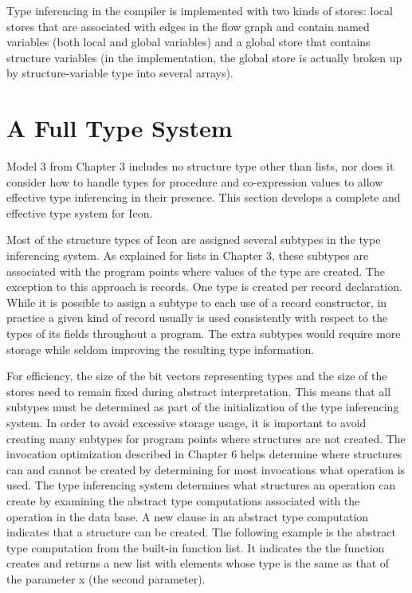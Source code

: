 Type inferencing in the compiler is implemented with two kinds of
stores: local stores that are associated with edges in the flow graph
and contain named variables (both local and global variables) and a
global store that contains structure variables (in the implementation,
the global store is actually broken up by structure-variable type into
several arrays).


\section{A Full Type System}

Model 3 from Chapter 3 includes no structure type other than lists,
nor does it consider how to handle types for procedure and
co-expression values to allow effective type inferencing in their
presence. This section develops a complete and effective type system
for Icon.

Most of the structure types of Icon are assigned several subtypes in
the type inferencing system. As explained for lists in Chapter 3,
these subtypes are associated with the program points where values of
the type are created. The exception to this approach is records. One
type is created per record declaration. While it is possible to assign
a subtype to each use of a record constructor, in practice a given
kind of record usually is used consistently with respect to the types
of its fields throughout a program. The extra subtypes would require
more storage while seldom improving the resulting type information.

For efficiency, the size of the bit vectors representing types and the
size of the stores need to remain fixed during abstract
interpretation. This means that all subtypes must be determined as
part of the initialization of the type inferencing system. In order to
avoid excessive storage usage, it is important to avoid creating many
subtypes for program points where structures are not created. The
invocation optimization described in Chapter 6 helps determine where
structures can and cannot be created by determining for most
invocations what operation is used. The type inferencing system
determines what structures an operation can create by examining the
abstract type computations associated with the operation in the data
base. A new clause in an abstract type computation indicates that a
structure can be created. The following example is the abstract type
computation from the built-in function list. It indicates the the
function creates and returns a new list with elements whose type is
the same as that of the parameter x (the second parameter).

